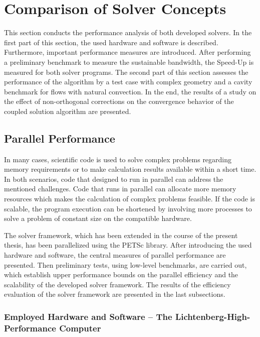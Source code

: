 \section{Comparison of Solver Concepts}
\label{sec:compare}

This section conducts the performance analysis of both developed solvers. In the first part of this section, the used hardware and software is described. Furthermore, important performance measures are introduced. After performing a preliminary benchmark to measure the sustainable bandwidth, the Speed-Up is measured for both solver programs. The second part of this section assesses the performance of the algorithm by a test case with complex geometry and a cavity benchmark for flows with natural convection. In the end, the results of a study on the effect of non-orthogonal corrections on the convergence behavior of the coupled solution algorithm are presented.
  
\subsection{Parallel Performance}

In many cases, scientific code is used to solve complex problems regarding memory requirements or to make calculation results available within a short time. In both scenarios, code that designed to run in parallel can address the mentioned challenges. Code that runs in parallel can allocate more memory resources which makes the calculation of complex problems feasible. If the code is scalable, the program execution can be shortened by involving more processes to solve a problem of constant size on the compatible hardware.

The solver framework, which has been extended in the course of the present thesis, has been parallelized using the PETSc library. After introducing the used hardware and software, the central measures of parallel performance are presented. Then preliminary tests, using low-level benchmarks, are carried out, which establish upper performance bounds on the parallel efficiency and the scalability of the developed solver framework. The results of the efficiency evaluation of the solver framework are presented in the last subsections.

\subsubsection{Employed Hardware and Software -- The Lichtenberg-High-Performance Computer }
\label{sec:hhlr}

